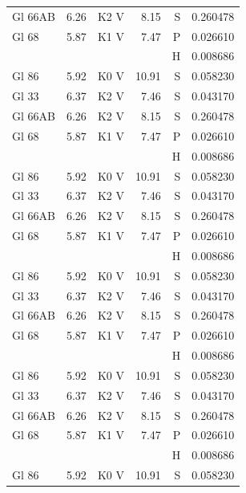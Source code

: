 \documentclass{aa}
\begin{document}
\begin{appendix}
\begin{landscape}
\begin{longtable}{lllrrr}
			Gl 66AB   & 6.26    & K2 V     & 8.15     & S    & 0.260478   \\
			Gl 68     & 5.87    & K1 V     & 7.47     & P    & 0.026610   \\
			          &         &          &          & H    & 0.008686   \\
			Gl 86     & 5.92    & K0 V     & 10.91    & S    & 0.058230   \\   Gl 33    & 6.37 & K2 V & 7.46 & S & 0.043170\\
			Gl 66AB   & 6.26    & K2 V     & 8.15     & S    & 0.260478   \\
			Gl 68     & 5.87    & K1 V     & 7.47     & P    & 0.026610   \\
			          &         &          &          & H    & 0.008686   \\
			Gl 86     & 5.92    & K0 V     & 10.91    & S    & 0.058230   \\   Gl 33    & 6.37 & K2 V & 7.46 & S & 0.043170\\
			Gl 66AB   & 6.26    & K2 V     & 8.15     & S    & 0.260478   \\
			Gl 68     & 5.87    & K1 V     & 7.47     & P    & 0.026610   \\
			          &         &          &          & H    & 0.008686   \\
			Gl 86     & 5.92    & K0 V     & 10.91    & S    & 0.058230   \\   Gl 33    & 6.37 & K2 V & 7.46 & S & 0.043170\\
			Gl 66AB   & 6.26    & K2 V     & 8.15     & S    & 0.260478   \\
			Gl 68     & 5.87    & K1 V     & 7.47     & P    & 0.026610   \\
			          &         &          &          & H    & 0.008686   \\
			Gl 86     & 5.92    & K0 V     & 10.91    & S    & 0.058230   \\   Gl 33    & 6.37 & K2 V & 7.46 & S & 0.043170\\
			Gl 66AB   & 6.26    & K2 V     & 8.15     & S    & 0.260478   \\
			Gl 68     & 5.87    & K1 V     & 7.47     & P    & 0.026610   \\
			          &         &          &          & H    & 0.008686   \\
			Gl 86     & 5.92    & K0 V     & 10.91    & S    & 0.058230   \\
		\end{longtable}
	\end{landscape}


	\FloatBarrier %
	\clearpage


\end{appendix}
\end{document}
